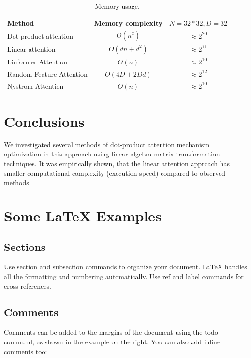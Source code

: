 \begin{table}
\centering
\begin{tabular}{l|c|c}
Method & Memory complexity & $N=32*32, D=32$ \\\hline
Dot-product attention & $ O(n^2) $ & $\approx 2^{20}$ \\
Linear attention & $ O(dn+d^2) $ & $\approx 2^{11}$ \\
Linformer Attention & $ O(n) $ & $ \approx 2^{10} $ \\
Random Feature Attention & $O(4D + 2Dd)$ & $\approx 2^{12}$ \\
Nystrom Attention & $O(n)$ & $\approx 2^{10}$
\end{tabular}
\caption{\label{tab:mem-complexity}Memory usage.}
\end{table}



\section{Conclusions}

We investigated several methods of dot-product attention mechanism optimization in this approach using linear algebra matrix transformation techniques. It was empirically shown, that the linear attention approach has smaller computational complexity (execution speed) compared to observed methods. 



\section{Some \LaTeX{} Examples}
\label{sec:examples}

\subsection{Sections}

Use section and subsection commands to organize your document. \LaTeX{} handles all the formatting and numbering automatically. Use ref and label commands for cross-references.

\subsection{Comments}

Comments can be added to the margins of the document using the  todo command, as shown in the example on the right. You can also add inline comments too:

